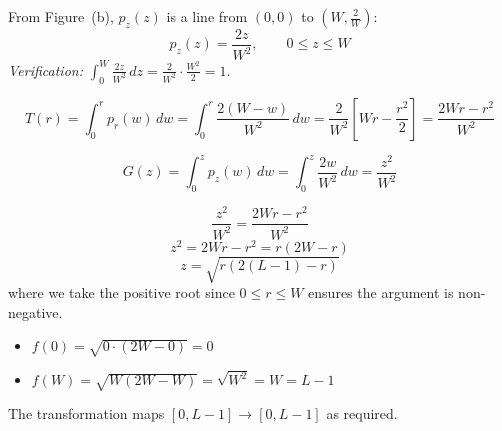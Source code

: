 \documentclass[12pt]{article}
\begin{document}
\begin{stepbox}
From Figure~(b), $p_z(z)$ is a line from $(0,0)$ to $(W, \tfrac{2}{W})$:
\[
p_z(z) = \frac{2z}{W^2}, \qquad 0 \leq z \leq W
\]
\textit{Verification:} $\displaystyle\int_0^W \frac{2z}{W^2}\,dz = \frac{2}{W^2}\cdot\frac{W^2}{2} = 1.$ \checkmark
\end{stepbox}

\begin{stepbox}
\[
T(r) = \int_0^r p_r(w)\,dw = \int_0^r \frac{2(W-w)}{W^2}\,dw = \frac{2}{W^2}\left[Wr - \frac{r^2}{2}\right] = \frac{2Wr - r^2}{W^2}
\]
\end{stepbox}

\begin{stepbox}
\[
G(z) = \int_0^z p_z(w)\,dw = \int_0^z \frac{2w}{W^2}\,dw = \frac{z^2}{W^2}
\]
\end{stepbox}

\begin{stepbox}[Step 5: Set $G(z) = T(r)$ and Solve for $z$]
\[
\frac{z^2}{W^2} = \frac{2Wr - r^2}{W^2}
\]
\[
z^2 = 2Wr - r^2 = r(2W - r)
\]
\[
\boxed{z = \sqrt{r(2(L-1) - r)}}
\]
where we take the positive root since $0 \leq r \leq W$ ensures the argument is non-negative.
\end{stepbox}

\begin{stepbox}
\begin{itemize}[leftmargin=*]
\item $f(0) = \sqrt{0 \cdot (2W - 0)} = 0$ \checkmark
\item $f(W) = \sqrt{W(2W - W)} = \sqrt{W^2} = W = L-1$ \checkmark
\end{itemize}
The transformation maps $[0, L-1] \to [0, L-1]$ as required.
\end{stepbox}
\end{document}
